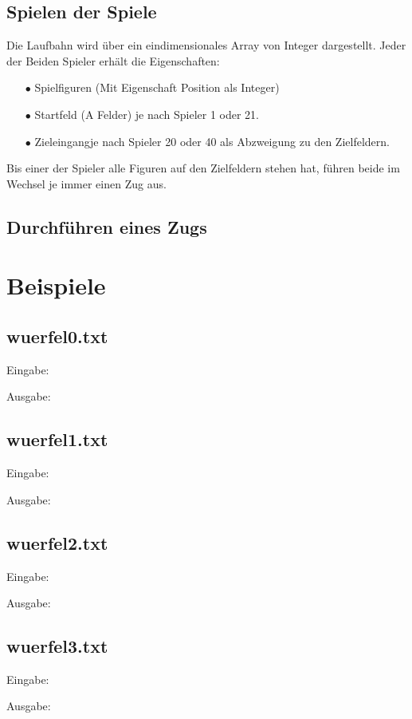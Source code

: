 \documentclass[a4paper,11pt,ngerman]{scrartcl}
\begin{document}
\subsection{Spielen der \glqq Spiele\grqq}
Die Laufbahn wird über ein eindimensionales Array von Integer dargestellt. Jeder der Beiden Spieler erhält die Eigenschaften:
\begin{enumerate}
	\item[$\bullet$] Spielfiguren (Mit Eigenschaft Position als Integer)
	\item[$\bullet$] Startfeld (\glqq A Felder\grqq) je nach Spieler 1 oder 21.
	\item[$\bullet$] \glqq Zieleingang\grqq \space je nach Spieler 20 oder 40 als Abzweigung zu den Zielfeldern.	
\end{enumerate} 
Bis einer der Spieler alle Figuren auf den Zielfeldern stehen hat, führen beide im Wechsel je immer einen Zug aus.
\subsection{Durchführen eines Zugs}


 

\section{Beispiele}
\subsection{wuerfel0.txt}
Eingabe:

\begin{tcolorbox}[center,width=12cm,title=Textfiles/wuerfel0.txt]
	\centering
	
\end{tcolorbox}
Ausgabe:

\subsection{wuerfel1.txt}
Eingabe:

Ausgabe:

\subsection{wuerfel2.txt}
Eingabe:

Ausgabe:

\subsection{wuerfel3.txt}
Eingabe:

Ausgabe:

\end{document}
